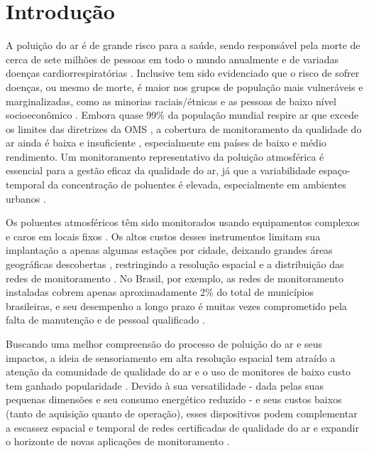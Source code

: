\chapter{Introdução}

A poluição do ar é de grande risco para a saúde, sendo responsável pela morte de cerca de sete milhões de pessoas em todo o mundo anualmente e de variadas doenças cardiorrespiratórias \cite{who2021}. Inclusive tem sido evidenciado que o risco de sofrer doenças, ou mesmo de morte, é maior nos grupos de população mais vulneráveis e marginalizadas, como as minorias raciais/étnicas e as pessoas de baixo nível socioeconômico \cite{Jbaily2022AirGroups}. Embora quase 99\% da população mundial respire ar que excede os limites das diretrizes da OMS \cite{who2021}, a cobertura de monitoramento da qualidade do ar ainda é baixa e insuficiente \cite{Munir2019AnalysingSheffield}, especialmente em países de baixo e médio rendimento. Um monitoramento representativo da poluição atmosférica é essencial para a gestão eficaz da qualidade do ar, já que a variabilidade espaço-temporal da concentração de poluentes é elevada, especialmente em ambientes urbanos \cite{Kumar2015,Mead2013TheNetworks}.

Os poluentes atmosféricos têm sido monitorados usando equipamentos complexos e caros em locais fixos \cite{Kang2022PerformanceReview}. Os altos custos desses instrumentos limitam sua implantação a apenas algumas estações por cidade, deixando grandes áreas geográficas descobertas \cite{Munir2019AnalysingSheffield}, restringindo a resolução espacial e a distribuição das redes de monitoramento \cite{Jiao2016CommunityStates,Kumar2015}. No Brasil, por exemplo, as redes de monitoramento instaladas cobrem apenas aproximadamente 2\% do total de municípios brasileiras, e seu desempenho a longo prazo é muitas vezes comprometido pela falta de manutenção e de pessoal qualificado \cite{Vormittag2021AnaliseBrasil}.

Buscando uma melhor compreensão do processo de poluição do ar e seus impactos, a ideia de sensoriamento em alta resolução espacial tem atraído a atenção da comunidade de qualidade do ar e o uso de monitores de baixo custo tem ganhado popularidade \cite{Motlagh2020TowardMonitoring,Kumar2015}. Devido à sua versatilidade - dada pelas suas pequenas dimensões e seu consumo energético reduzido \cite{Lewis2018Low-costApplications} - e seus custos baixos (tanto de aquisição quanto de operação), esses dispositivos podem complementar a escassez espacial e temporal de redes certificadas de qualidade do ar e expandir o horizonte de novas aplicações de monitoramento \cite{Lewis2016EvaluatingResearch}. 

